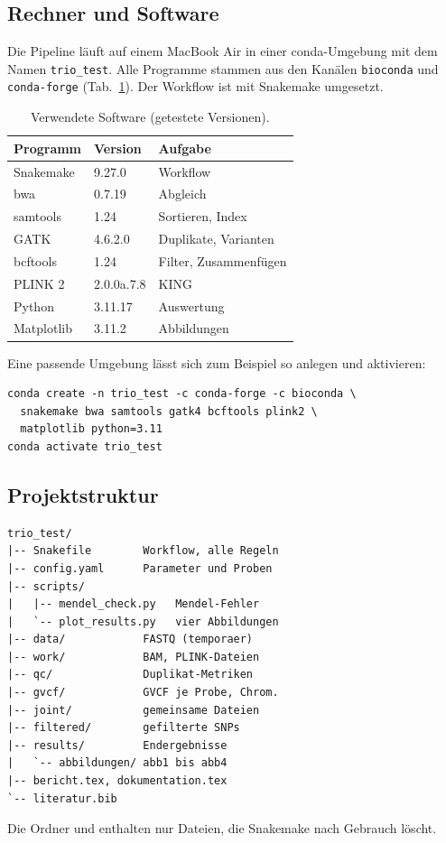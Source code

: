\documentclass[10pt,a4paper,twocolumn]{article}
\begin{document}
\subsection{Rechner und Software}
Die Pipeline läuft auf einem MacBook Air in einer conda-Umgebung mit dem Namen \texttt{trio\_test}. Alle Programme stammen aus den Kanälen \texttt{bioconda} und \texttt{conda-forge} (Tab.~\ref{tab:sw}). Der Workflow ist mit Snakemake \citep{molder2021} umgesetzt.

\begin{table}[t]
\centering
\small
\caption{Verwendete Software (getestete Versionen).}
\label{tab:sw}
\begin{tabular}{@{}lll@{}}
\toprule
Programm & Version & Aufgabe\\
\midrule
Snakemake & 9.27.0 & Workflow\\
bwa & 0.7.19 & Abgleich\\
samtools & 1.24 & Sortieren, Index\\
GATK & 4.6.2.0 & Duplikate, Varianten\\
bcftools & 1.24 & Filter, Zusammenfügen\\
PLINK 2 & 2.0.0a.7.8 & KING\\
Python & 3.11.17 & Auswertung\\
Matplotlib & 3.11.2 & Abbildungen\\
\bottomrule
\end{tabular}
\end{table}

Eine passende Umgebung lässt sich zum Beispiel so anlegen und aktivieren:
\begin{lstlisting}
conda create -n trio_test -c conda-forge -c bioconda \
  snakemake bwa samtools gatk4 bcftools plink2 \
  matplotlib python=3.11
conda activate trio_test
\end{lstlisting}

\subsection{Projektstruktur}
\begin{lstlisting}
trio_test/
|-- Snakefile        Workflow, alle Regeln
|-- config.yaml      Parameter und Proben
|-- scripts/
|   |-- mendel_check.py   Mendel-Fehler
|   `-- plot_results.py   vier Abbildungen
|-- data/            FASTQ (temporaer)
|-- work/            BAM, PLINK-Dateien
|-- qc/              Duplikat-Metriken
|-- gvcf/            GVCF je Probe, Chrom.
|-- joint/           gemeinsame Dateien
|-- filtered/        gefilterte SNPs
|-- results/         Endergebnisse
|   `-- abbildungen/ abb1 bis abb4
|-- bericht.tex, dokumentation.tex
`-- literatur.bib
\end{lstlisting}
Die Ordner  und  enthalten nur Dateien, die Snakemake nach Gebrauch löscht.
\end{document}
